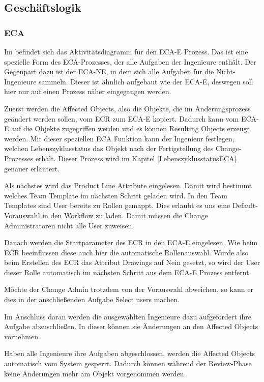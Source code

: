\subsection{Geschäftslogik} %
\label{sec:Geschaeftslogik}

\subsubsection{ECA}
Im  befindet sich das Aktivitätsdiagramm für den ECA-E Prozess.
Das ist eine spezielle Form des ECA-Prozesses, der alle Aufgaben der Ingenieure enthält.
Der Gegenpart dazu ist der ECA-NE, in dem sich alle Aufgaben für die Nicht-Ingenieure sammeln.
Dieser ist ähnlich aufgebaut wie der ECA-E, deswegen soll hier nur auf einen Prozess näher eingegangen werden.

Zuerst werden die \glqq Affected Objects\grqq{}, also die Objekte, die im Änderungsprozess geändert werden sollen, vom ECR zum ECA-E kopiert.
Dadurch kann vom ECA-E auf die Objekte zugegriffen werden und es können \glqq Resulting Objects\grqq{} erzeugt werden.
Mit dieser speziellen ECA Funktion kann der Ingenieur festlegen, welchen Lebenszyklusstatus das Objekt nach der Fertigstellung des Change-Prozesses erhält.
Dieser Prozess wird im Kapitel \ref{LebenszyklusstatusECA} genauer erläutert.

Als nächstes wird das \glqq Product Line Attribute\grqq{} eingelesen.
Damit wird bestimmt welches Team Template im nächsten Schritt geladen wird.
In den Team Templates sind User bereits zu Rollen gemappt.
Dies erlaubt es uns eine Default-Vorauswahl in den Workflow zu laden.
Damit müssen die Change Administratoren nicht alle User zuweisen.

Danach werden die Startparameter des ECR in den ECA-E eingelesen.
Wie beim ECR beeinflussen diese auch hier die automatische Rollenauswahl.
Wurde also \zB beim Erstellen des ECR das Attribut \glqq Drawings\grqq{} auf Nein gesetzt, so wird der User dieser Rolle automatisch im nächsten Schritt aus dem ECA-E Prozess entfernt.

Möchte der Change Admin trotzdem von der Vorauswahl abweichen, so kann er dies in der anschließenden Aufgabe \glqq Select users\grqq{} machen.

Im Anschluss daran werden die ausgewählten Ingenieure dazu aufgefordert ihre Aufgabe abzuschließen.
In dieser können sie Änderungen an den Affected Objects vornehmen.

Haben alle Ingenieure ihre Aufgaben abgeschlossen, werden die Affected Objects automatisch vom System gesperrt.
Dadurch können während der Review-Phase keine Änderungen mehr am Objekt vorgenommen werden.

